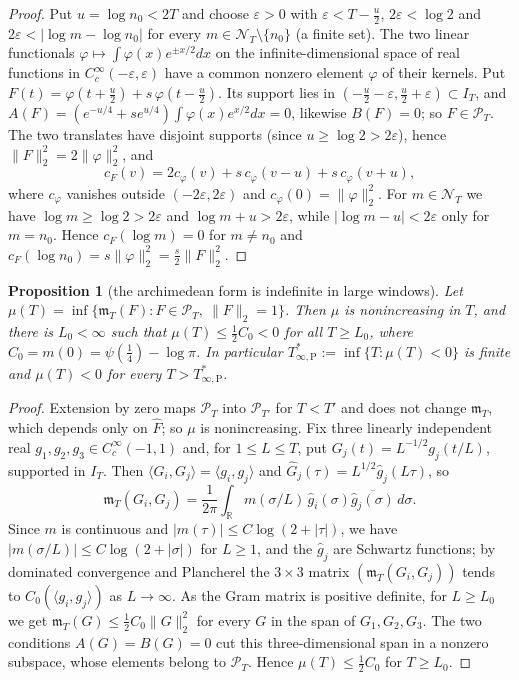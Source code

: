 \documentclass[11pt]{amsart}
\newtheorem{proposition}[theorem]{Proposition}
\theoremstyle{definition}
\theoremstyle{remark}
\numberwithin{equation}{section}
\newcommand{\R}{\mathbb{R}}
\newcommand{\IT}{I_T}                                  %
\newcommand{\Fh}{\widehat F}                           %
\newcommand{\cF}{c_F}                                  %
\newcommand{\PT}{\mathcal{P}_T}                        %
\newcommand{\NT}{\mathcal{N}_T}                        %
\newcommand{\mT}{\mathfrak{m}_T}                       %
\newcommand{\Tarch}{T^{*}_{\infty,\mathrm P}}          %
\begin{document}
\begin{proof}
Put $u=\log n_0<2T$ and choose $\varepsilon>0$ with $\varepsilon<T-\frac u2$, $2\varepsilon<\log2$ and
$2\varepsilon<|\log m-\log n_0|$ for every $m\in\NT\setminus\{n_0\}$ (a finite set). The two linear
functionals $\varphi\mapsto\int\varphi(x)e^{\pm x/2}dx$ on the infinite-dimensional space of real functions in
$C_c^\infty(-\varepsilon,\varepsilon)$ have a common nonzero element $\varphi$ of their kernels. Put
$F(t)=\varphi(t+\frac u2)+s\,\varphi(t-\frac u2)$. Its support lies in $(-\frac u2-\varepsilon,\frac u2+\varepsilon)
\subset\IT$, and $A(F)=(e^{-u/4}+se^{u/4})\int\varphi(x)e^{x/2}dx=0$, likewise $B(F)=0$; so $F\in\PT$. The two
translates have disjoint supports (since $u\ge\log2>2\varepsilon$), hence $\|F\|_2^2=2\|\varphi\|_2^2$, and
\[
  \cF(v)=2c_\varphi(v)+s\,c_\varphi(v-u)+s\,c_\varphi(v+u),
\]
where $c_\varphi$ vanishes outside $(-2\varepsilon,2\varepsilon)$ and $c_\varphi(0)=\|\varphi\|_2^2$. For
$m\in\NT$ we have $\log m\ge\log2>2\varepsilon$ and $\log m+u>2\varepsilon$, while
$|\log m-u|<2\varepsilon$ only for $m=n_0$. Hence $\cF(\log m)=0$ for $m\ne n_0$ and
$\cF(\log n_0)=s\|\varphi\|_2^2=\frac s2\|F\|_2^2$.
\end{proof}

\begin{proposition}[the archimedean form is indefinite in large windows]\label{w3:prop:archneg}
Let $\mu(T)=\inf\{\mT(F):F\in\PT,\ \|F\|_2=1\}$. Then $\mu$ is nonincreasing in $T$, and there is $L_0<\infty$
such that $\mu(T)\le\frac12C_0<0$ for all $T\ge L_0$, where $C_0=m(0)=\psi(\frac14)-\log\pi$. In particular
$\Tarch:=\inf\{T:\mu(T)<0\}$ is finite and $\mu(T)<0$ for every $T>\Tarch$.
\end{proposition}

\begin{proof}
Extension by zero maps $\mathcal P_{T}$ into $\mathcal P_{T'}$ for $T<T'$ and does not change $\mT$, which
depends only on $\Fh$; so $\mu$ is nonincreasing. Fix three linearly independent real
$g_1,g_2,g_3\in C_c^\infty(-1,1)$ and, for $1\le L\le T$, put $G_j(t)=L^{-1/2}g_j(t/L)$, supported in $\IT$.
Then $\langle G_i,G_j\rangle=\langle g_i,g_j\rangle$ and $\widehat G_j(\tau)=L^{1/2}\widehat g_j(L\tau)$, so
\[
  \mT(G_i,G_j)=\frac1{2\pi}\int_\R m(\sigma/L)\,\widehat g_i(\sigma)\overline{\widehat g_j(\sigma)}\,d\sigma .
\]
Since $m$ is continuous and $|m(\tau)|\le C\log(2+|\tau|)$, we have $|m(\sigma/L)|\le C\log(2+|\sigma|)$ for
$L\ge1$, and the $\widehat g_j$ are Schwartz functions; by dominated convergence and Plancherel the $3\times3$
matrix $(\mT(G_i,G_j))$ tends to $C_0(\langle g_i,g_j\rangle)$ as $L\to\infty$. As the Gram matrix is positive
definite, for $L\ge L_0$ we get $\mT(G)\le\frac12C_0\|G\|_2^2$ for every $G$ in the span of $G_1,G_2,G_3$. The
two conditions $A(G)=B(G)=0$ cut this three-dimensional span in a nonzero subspace, whose elements belong to
$\PT$. Hence $\mu(T)\le\frac12C_0$ for $T\ge L_0$.
\end{proof}
\end{document}
